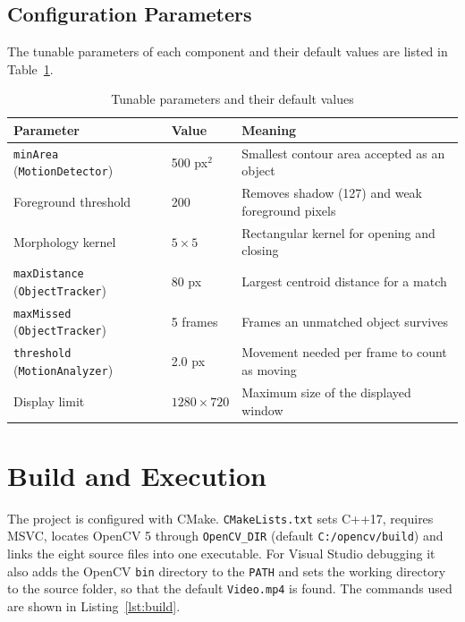 \documentclass[12pt,a4paper,oneside]{book}
\begin{document}
\subsection{Configuration Parameters}
The tunable parameters of each component and their default values are listed in Table~\ref{tab:params}.

\begin{table}[H]
\centering
\caption{Tunable parameters and their default values}
\label{tab:params}
\small
\begin{tabular}{@{}p{4.1cm}p{2.4cm}p{8.5cm}@{}}
\toprule
\textbf{Parameter} & \textbf{Value} & \textbf{Meaning}\\
\midrule
\texttt{minArea} (\texttt{MotionDetector}) & 500 px$^2$ & Smallest contour area accepted as an object\\
Foreground threshold & 200 & Removes shadow (127) and weak foreground pixels\\
Morphology kernel & $5\times5$ & Rectangular kernel for opening and closing\\
\texttt{maxDistance} (\texttt{ObjectTracker}) & 80 px & Largest centroid distance for a match\\
\texttt{maxMissed} (\texttt{ObjectTracker}) & 5 frames & Frames an unmatched object survives\\
\texttt{threshold} (\texttt{MotionAnalyzer}) & 2.0 px & Movement needed per frame to count as moving\\
Display limit & $1280\times720$ & Maximum size of the displayed window\\
\bottomrule
\end{tabular}
\end{table}

\section{Build and Execution}
The project is configured with CMake. \texttt{CMakeLists.txt} sets C++17, requires MSVC, locates OpenCV 5 through \texttt{OpenCV\_DIR} (default \texttt{C:/opencv/build}) and links the eight source files into one executable. For Visual Studio debugging it also adds the OpenCV \texttt{bin} directory to the \texttt{PATH} and sets the working directory to the source folder, so that the default \texttt{Video.mp4} is found. The commands used are shown in Listing~\ref{lst:build}.
\end{document}

